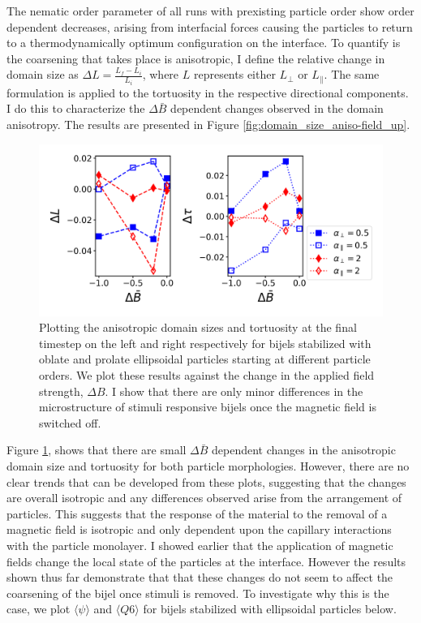 The nematic order parameter of all runs with prexisting particle order
show order dependent decreases, arising from interfacial forces causing
the particles to return to a thermodynamically optimum configuration on
the interface. To quantify is the coarsening that takes place is
anisotropic, I define the relative change in domain size as
$\Delta L = \frac{L_{f} - L_{i}}{L_{i}}$, where $L$ represents
either $L_{\perp}$ or $L_{\parallel}$. The same formulation is
applied to the tortuosity in the respective directional components. I
do this to characterize the $\Delta \bar{B}$ dependent changes
observed in the domain anisotropy. The results are presented in Figure
\ref{fig:domain_size_aniso-field_up}.

\begin{figure} 
\centering 
\includegraphics[scale = 0.5]{../figures/results/paper2/domain_size_aniso-field_down.png} 
\caption{Plotting the anisotropic domain sizes and tortuosity at the final timestep on the left and right respectively for bijels stabilized with oblate and 
         prolate ellipsoidal particles starting at different particle orders. We plot these results against the change in the applied field strength, 
         $\Delta B$. I show that there are only minor differences in the microstructure of stimuli responsive bijels once the magnetic field is switched off.} 
\label{fig:domain_size_aniso-field_down} 
\end{figure}

Figure \ref{fig:domain_size_aniso-field_down}, shows that there are
small $\Delta \bar{B}$ dependent changes in the anisotropic domain
size and tortuosity for both particle morphologies. However, there are
no clear trends that can be developed from these plots, suggesting that
the changes are overall isotropic and any differences observed arise
from the arrangement of particles. This suggests that the response of
the material to the removal of a magnetic field is isotropic and only
dependent upon the capillary interactions with the particle monolayer.
I showed earlier that the application of magnetic fields change the
local state of the particles at the interface. However the results shown
thus far demonstrate that that these changes do not seem to affect the
coarsening of the bijel once stimuli is removed. To investigate why this
is the case, we plot $\langle \psi \rangle$ and
$\langle Q6 \rangle$ for bijels stabilized with ellipsoidal particles
below.

